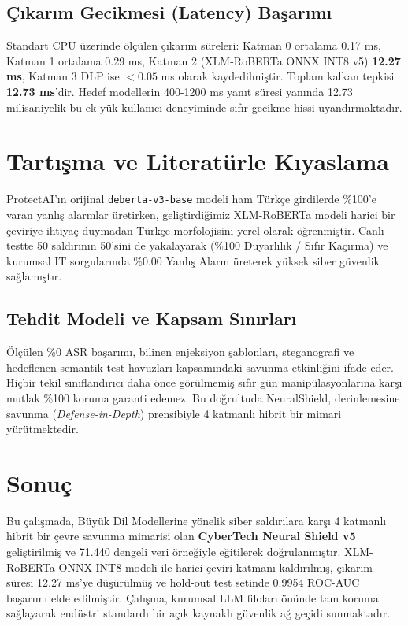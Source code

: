 \documentclass[conference]{IEEEtran}
\begin{document}
\subsection{Çıkarım Gecikmesi (Latency) Başarımı}
Standart CPU üzerinde ölçülen çıkarım süreleri: Katman 0 ortalama 0.17 ms, Katman 1 ortalama 0.29 ms, Katman 2 (XLM-RoBERTa ONNX INT8 v5) \textbf{12.27 ms}, Katman 3 DLP ise $<0.05$ ms olarak kaydedilmiştir. Toplam kalkan tepkisi \textbf{12.73 ms}'dir. Hedef modellerin 400-1200 ms yanıt süresi yanında 12.73 milisaniyelik bu ek yük kullanıcı deneyiminde sıfır gecikme hissi uyandırmaktadır.

\section{Tartışma ve Literatürle Kıyaslama}
ProtectAI'ın orijinal \texttt{deberta-v3-base} modeli ham Türkçe girdilerde \%100'e varan yanlış alarmlar üretirken, geliştirdiğimiz XLM-RoBERTa modeli harici bir çeviriye ihtiyaç duymadan Türkçe morfolojisini yerel olarak öğrenmiştir. Canlı testte 50 saldırının 50'sini de yakalayarak (\%100 Duyarlılık / Sıfır Kaçırma) ve kurumsal IT sorgularında \%0.00 Yanlış Alarm üreterek yüksek siber güvenlik sağlamıştır.

\subsection{Tehdit Modeli ve Kapsam Sınırları}
Ölçülen \%0 ASR başarımı, bilinen enjeksiyon şablonları, steganografi ve hedeflenen semantik test havuzları kapsamındaki savunma etkinliğini ifade eder. Hiçbir tekil sınıflandırıcı daha önce görülmemiş sıfır gün manipülasyonlarına karşı mutlak \%100 koruma garanti edemez. Bu doğrultuda NeuralShield, derinlemesine savunma (\textit{Defense-in-Depth}) prensibiyle 4 katmanlı hibrit bir mimari yürütmektedir.

\section{Sonuç}
Bu çalışmada, Büyük Dil Modellerine yönelik siber saldırılara karşı 4 katmanlı hibrit bir çevre savunma mimarisi olan \textbf{CyberTech Neural Shield v5} geliştirilmiş ve 71.440 dengeli veri örneğiyle eğitilerek doğrulanmıştır. XLM-RoBERTa ONNX INT8 modeli ile harici çeviri katmanı kaldırılmış, çıkarım süresi 12.27 ms'ye düşürülmüş ve hold-out test setinde 0.9954 ROC-AUC başarımı elde edilmiştir. Çalışma, kurumsal LLM filoları önünde tam koruma sağlayarak endüstri standardı bir açık kaynaklı güvenlik ağ geçidi sunmaktadır.
\end{document}
